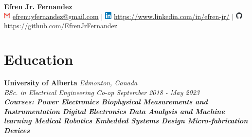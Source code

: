 \documentclass[a4paper,20pt]{article}
\begin{document}
\begin{center}
    {\huge \textbf{Efren Jr. Fernandez}} \vspace{5pt}\\ %
    \includegraphics[height = 10pt]{images/Gmail_icon_(2020).png} \href{mailto:}{efrenuyfernandez@gmail.com} $\vert$
    \includegraphics[height = 10pt]{images/linkedin_logo.png} \href{https://www.linkedin.com/in/efren-jr/}{https://www.linkedin.com/in/efren-jr/} $\vert$ 
    \includegraphics[height = 10pt]{images/github-mark.png}
    \href{https://github.com/EfrenJrFernandez}{https://github.com/EfrenJrFernandez}
    
\end{center}


\section{Education}
    \vspace{-1pt}
        \textbf{University of Alberta} \hspace{10.7cm}
        \textit{Edmonton, Canada} \\
        \textit{BSc. in Electrical Engineering Co-op}\hspace{8.25 cm}
        \textit{September 2018 - May 2023} \\
        \vspace{-10pt}
      {\scriptsize \textit{ \footnotesize{\newline{}\textbf{Courses: Power Electronics \textbullet{} Biophysical Measurements and Instrumentation \textbullet{} Digital Electronics \textbullet{} Data Analysis and Machine learning \textbullet{} Medical Robotics \textbullet{} Embedded Systems Design \textbullet{} Micro-fabrication Devices } }}}
\end{document}
